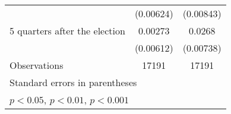 \begin{table}[htbp]
\begin{tabular}{l*{2}{c}}
                    &   (0.00624)         &   (0.00843)         \\
[1em]
 5 quarters after the election&     0.00273         &      0.0268\sym{***}\\
                    &   (0.00612)         &   (0.00738)         \\
\hline
Observations        &       17191         &       17191         \\
\hline\hline
\multicolumn{3}{l}{\footnotesize Standard errors in parentheses}\\
\multicolumn{3}{l}{\footnotesize \sym{*} \(p<0.05\), \sym{**} \(p<0.01\), \sym{***} \(p<0.001\)}\\
\end{tabular}
\end{table}
